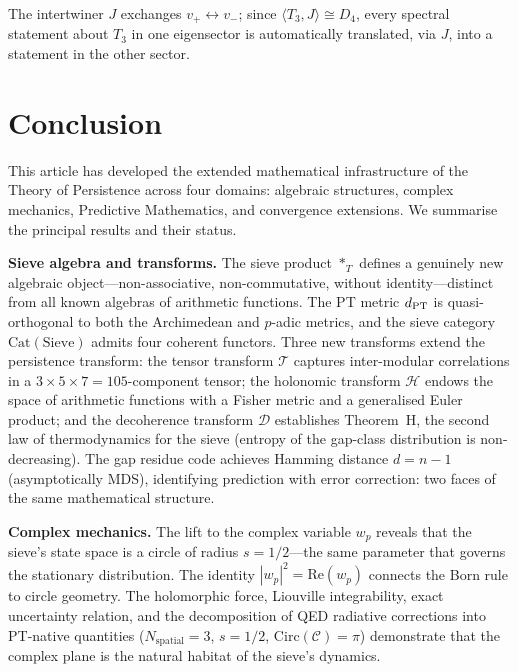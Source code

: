 \documentclass[12pt,a4paper]{article}
\begin{document}
\begin{remark}
The intertwiner $J$ exchanges $v_+ \leftrightarrow v_-$; since
$\langle T_3, J \rangle \cong D_4$, every spectral statement about $T_3$
in one eigensector is automatically translated, via $J$, into a
statement in the other sector.
\end{remark}

\newpage


\section{Conclusion}
\label{sec:conclusion}

This article has developed the extended mathematical infrastructure of
the Theory of Persistence across four domains: algebraic structures,
complex mechanics, Predictive Mathematics, and convergence extensions.
We summarise the principal results and their status.

\textbf{Sieve algebra and transforms.}
The sieve product $*_T$ defines a genuinely new algebraic object---non-associative,
non-commutative, without identity---distinct from all known algebras of
arithmetic functions.  The PT metric $d_{\rm PT}$ is quasi-orthogonal to
both the Archimedean and $p$-adic metrics, and the sieve category
$\mathrm{Cat}(\mathrm{Sieve})$ admits four coherent functors.  Three new
transforms extend the persistence transform: the tensor transform
$\mathcal{T}$ captures inter-modular correlations in a
$3{\times}5{\times}7 = 105$-component tensor; the holonomic transform
$\mathcal{H}$ endows the space of arithmetic functions with a Fisher metric
and a generalised Euler product; and the decoherence transform
$\mathcal{D}$ establishes Theorem~H, the second law of thermodynamics for
the sieve (entropy of the gap-class distribution is non-decreasing).  The
gap residue code achieves Hamming distance $d = n - 1$ (asymptotically MDS),
identifying prediction with error correction: two faces of the same
mathematical structure.

\textbf{Complex mechanics.}
The lift to the complex variable $w_p$ reveals that the sieve's state
space is a circle of radius $s = 1/2$---the same parameter that governs
the stationary distribution.  The identity $|w_p|^2 = \mathrm{Re}(w_p)$
connects the Born rule to circle geometry.  The holomorphic force, Liouville
integrability, exact uncertainty relation, and the decomposition of QED
radiative corrections into PT-native quantities ($N_{\mathrm{spatial}} = 3$,
$s = 1/2$, $\mathrm{Circ}(\mathcal{C}) = \pi$) demonstrate that the
complex plane is the natural habitat of the sieve's dynamics.
\end{document}
